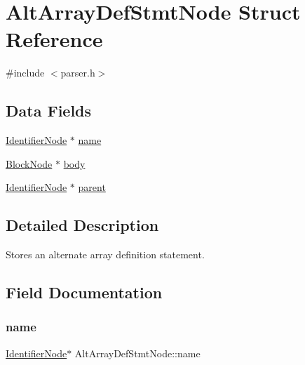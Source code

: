 \hypertarget{struct_alt_array_def_stmt_node}{}\section{Alt\+Array\+Def\+Stmt\+Node Struct Reference}
\label{struct_alt_array_def_stmt_node}


{\ttfamily \#include $<$parser.\+h$>$}

\subsection*{Data Fields}
\begin{DoxyCompactItemize}
\item 
\hyperlink{parser_8h_a930727769b8a8eb0d24d474f3aa12a43}{Identifier\+Node} $\ast$ \hyperlink{struct_alt_array_def_stmt_node_aefcc1c233800ecc80daa5b97067ec737}{name}
\item 
\hyperlink{struct_block_node}{Block\+Node} $\ast$ \hyperlink{struct_alt_array_def_stmt_node_aca77a8fb42a340a9e2542d27e8155605}{body}
\item 
\hyperlink{parser_8h_a930727769b8a8eb0d24d474f3aa12a43}{Identifier\+Node} $\ast$ \hyperlink{struct_alt_array_def_stmt_node_a033f2589bae62fc91efe8b60c58ba0d4}{parent}
\end{DoxyCompactItemize}


\subsection{Detailed Description}
Stores an alternate array definition statement. 

\subsection{Field Documentation}
\mbox{\label{struct_alt_array_def_stmt_node_aefcc1c233800ecc80daa5b97067ec737}} 
\subsubsection{\texorpdfstring{name}{name}}
{\footnotesize\ttfamily \hyperlink{parser_8h_a930727769b8a8eb0d24d474f3aa12a43}{Identifier\+Node}$\ast$ Alt\+Array\+Def\+Stmt\+Node\+::name}

